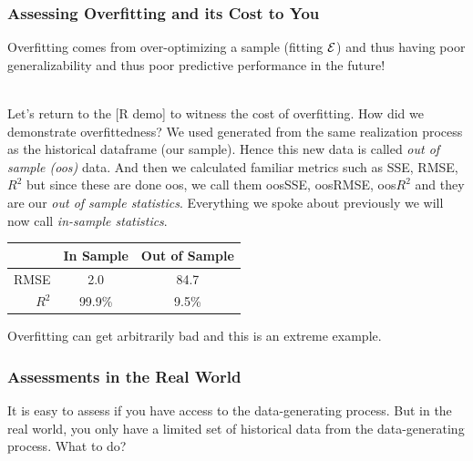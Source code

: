 \documentclass[handout]{beamer}
\begin{document}
\begin{frame}\frametitle{Assessing Overfitting and its Cost to You}
\small
Overfitting comes from over-optimizing a sample (fitting $\mathcal{E}$) and thus having poor generalizability and thus poor predictive performance in the future! \\~\\ \pause

Let's return to the [R demo] to witness the cost of overfitting. \pause How did we demonstrate overfittedness? \pause We used  generated from the same realization process as the historical dataframe (our sample). Hence this new data is called \emph{out of sample (oos)} data. And then we calculated familiar metrics such as SSE, RMSE, $R^2$ but since these are done oos, we call them oosSSE, oosRMSE, oos$R^2$ and they are our \emph{out of sample statistics}. Everything we spoke about previously we will now call \emph{in-sample statistics}.

\begin{table}
\centering
\begin{tabular}{rcc}
& In Sample & Out of Sample \\ \hline
RMSE   & 2.0 & 84.7 \\
$R^2$ & 99.9\% & 9.5\%
\end{tabular}
\end{table}

Overfitting can get arbitrarily bad and this is an extreme example.
	
\end{frame}

\begin{frame}\frametitle{Assessments in the Real World}

It is easy to assess if you have access to the data-generating process. But in the real world, you only have a limited set of historical data from the data-generating process. What to do?


	
\end{frame}
\end{document}
